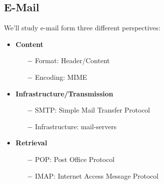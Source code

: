 \documentclass[a4paper, fontsize=8pt, landscape, DIV=1]{scrartcl}
\begin{document}
\begin{multicols*}{4}
		\subsection{E-Mail}
		We'll study e-mail form three different perspectives:
		\begin{itemize}[noitemsep]
			\item \textbf{Content}
			\begin{itemize}
				\item[$-$] Format: Header/Content
				\item[$-$] Encoding: MIME
			\end{itemize}
			\item \textbf{Infrastructure/Transmission}
			\begin{itemize}
				\item[$-$] SMTP: Simple Mail Transfer Protocol
				\item[$-$] Infrastructure: mail-servers 
			\end{itemize}
			\item \textbf{Retrieval}
			\begin{itemize}
				\item[$-$] POP: Post Office Protocol
				\item[$-$] IMAP: Internet Access Message Protocol
			\end{itemize}
		\end{itemize}
		

\end{multicols*}
\end{document}
